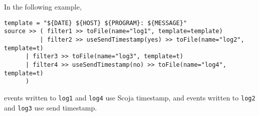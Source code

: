 In the following example,
\begin{verbatim}
template = "${DATE} ${HOST} ${PROGRAM}: ${MESSAGE}"
source >> ( filter1 >> toFile(name="log1", template=template)
          | filter2 >> useSendTimestamp(yes) >> toFile(name="log2", template=t)
	  | filter3 >> toFile(name="log3", template=t)
	  | filter4 >> useSendTimestamp(no) >> toFile(name="log4", template=t)
	  )
\end{verbatim}
events written to {\tt log1} and {\tt log4} use Scoja timestamp,
and events written to {\tt log2} and {\tt log3} use send timestamp.

